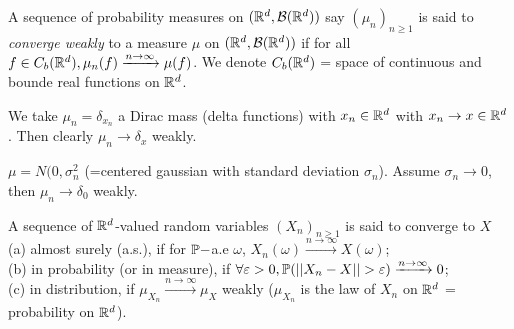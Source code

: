 \documentclass[a4paper]{article}
\begin{document}
\begin{defi}
A sequence of probability measures on $(\R^d,\mathcal{B}(\R^d))$ say $(\mu_n)_{n \geq 1}$ is said to \emph{converge weakly} to a measure $\mu$ on $(\R^d,\mathcal{B}(\R^d))$ if for all $f \in C_b (\R^d), \mu_n(f) \xrightarrow{n \to \infty} \mu(f)$.
We denote $C_b(\R^d)$ = space of continuous and bounde real functions on $\R^d$.
\end{defi}

\begin{eg}
We take $\mu_n = \delta_{x_n}$ a Dirac mass (delta functions) with $x_n \in \R^d$ with $x_n \to x \in \R^d$. Then clearly $\mu_n \to \delta_x$ weakly.
\end{eg}

\begin{eg}
$\mu = N(0,\sigma_n^2$ (=centered gaussian with standard deviation $\sigma_n$). Assume $\sigma_n \to 0$, then $\mu_n \to \delta_0$ weakly.
\end{eg}

\begin{defi}
A sequence of $\R^d$-valued random variables $(X_n)_{n \geq 1}$ is said to converge to $X$\\
(a) almost surely (a.s.), if for $\P-$a.e $\omega$, $X_n(\omega) \xrightarrow{n \to \infty} X(\omega)$;\\
(b) in probability (or in measure), if $\forall \varepsilon>0, \P(||X_n-X||>\varepsilon) \xrightarrow{n \to \infty} 0$;\\
(c) in distribution, if $\mu_{X_n} \xrightarrow{n \to \infty} \mu_X$ weakly ($\mu_{X_n}$ is the law of $X_n$ on $\R^d$ = probability on $\R^d$).
\end{defi}
\end{document}
